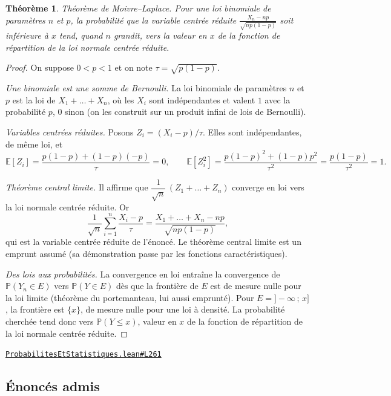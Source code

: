 \documentclass[11pt,a4paper]{article}
\theoremstyle{definition}
\theoremstyle{plain}
\newtheorem{theoreme}{Théorème}
\newcommand{\source}[2]{\par\smallskip\noindent\hfill{\footnotesize\href{#1}{\texttt{#2}}}\par\smallskip}
\begin{document}
\begin{theoreme}
\emph{Théorème de Moivre--Laplace.} Pour une loi binomiale de paramètres $n$ et $p$, la
probabilité que la variable centrée réduite $\frac{X_n - np}{\sqrt{np(1-p)}}$ soit inférieure
à $x$ tend, quand $n$ grandit, vers la valeur en $x$ de la fonction de répartition de la loi
normale centrée réduite.
\end{theoreme}
\begin{proof}
On suppose $0 < p < 1$ et on note $\tau = \sqrt{p(1-p)}$.

\emph{Une binomiale est une somme de Bernoulli.} La loi binomiale de paramètres $n$ et $p$ est
la loi de $X_1 + \dots + X_n$, où les $X_i$ sont indépendantes et valent $1$ avec la
probabilité $p$, $0$ sinon (on les construit sur un produit infini de lois de Bernoulli).

\emph{Variables centrées réduites.} Posons $Z_i = (X_i - p)/\tau$. Elles sont indépendantes,
de même loi, et
\[ \mathbb{E}[Z_i] = \frac{p(1-p) + (1-p)(-p)}{\tau} = 0 ,
   \qquad
   \mathbb{E}[Z_i^2] = \frac{p(1-p)^2 + (1-p)p^2}{\tau^2} = \frac{p(1-p)}{\tau^2} = 1 . \]

\emph{Théorème central limite.} Il affirme que $\dfrac{1}{\sqrt n}\,(Z_1 + \dots + Z_n)$
converge en loi vers la loi normale centrée réduite. Or
\[ \frac{1}{\sqrt n}\sum_{i=1}^n \frac{X_i - p}{\tau} = \frac{X_1 + \dots + X_n - np}{\sqrt{np(1-p)}} , \]
qui est la variable centrée réduite de l'énoncé. Le théorème central limite est
un emprunt assumé (sa démonstration passe par les fonctions caractéristiques).

\emph{Des lois aux probabilités.} La convergence en loi entraîne la convergence de
$\mathbb{P}(Y_n \in E)$ vers $\mathbb{P}(Y \in E)$ dès que la frontière de $E$ est de mesure
nulle pour la loi limite (théorème du portemanteau, lui aussi emprunté). Pour
$E = {]-\infty\,;\,x]}$, la frontière est $\{x\}$, de mesure nulle pour une loi à densité.
La probabilité cherchée tend donc vers $\mathbb{P}(Y \le x)$, valeur en $x$ de la fonction de
répartition de la loi normale centrée réduite.
\end{proof}
\source{https://github.com/Commutator-IO/learn-lean/blob/main/courses/02-lycee/09-probabilites-et-statistiques/ProbabilitesEtStatistiques.lean\#L261}{ProbabilitesEtStatistiques.lean\#L261}

\subsection{Énoncés admis}
\end{document}
